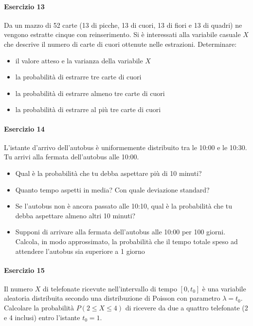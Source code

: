 \documentclass[12pt]{article}
\begin{document}
    \paragraph{Esercizio 13}
    Da un mazzo di 52 carte (13 di picche, 13 di cuori, 13 di fiori e 13 di quadri) ne vengono estratte cinque con reinserimento. Si è interessati alla variabile casuale $X$ che descrive il numero di carte di cuori ottenute nelle estrazioni. Determinare:
    \begin{itemize}
        \item il valore atteso e la varianza della variabile $X$
        \item la probabilità di estrarre tre carte di cuori
        \item la probabilità di estrarre almeno tre carte di cuori
        \item la probabilità di estrarre al più tre carte di cuori
    \end{itemize}
    \paragraph{Esercizio 14}
    L’istante d’arrivo dell’autobus è uniformemente distribuito tra le 10:00 e le 10:30. Tu arrivi alla fermata dell’autobus alle 10:00.
    \begin{itemize}
        \item Qual è la probabilità che tu debba aspettare più di 10 minuti?
        \item Quanto tempo aspetti in media? Con quale deviazione standard?
        \item Se l’autobus non è ancora passato alle 10:10, qual è la probabilità che tu debba aspettare almeno altri 10 minuti?
        \item Supponi di arrivare alla fermata dell’autobus alle 10:00 per 100 giorni. Calcola, in modo approssimato, la probabilità che il tempo totale speso ad attendere l’autobus sia superiore a 1 giorno
    \end{itemize}
    \paragraph{Esercizio 15}
    Il numero $X$ di telefonate ricevute nell'intervallo di tempo $[0, t_0]$ è una variabile aleatoria distribuita secondo una distribuzione di Poisson con parametro $\lambda=t_0$.
    \\Calcolare la probabilità $P(2 \leq X \leq 4)$ di ricevere da due a quattro telefonate (2 e 4 inclusi) entro l'istante $t_0=1$.
\end{document}
